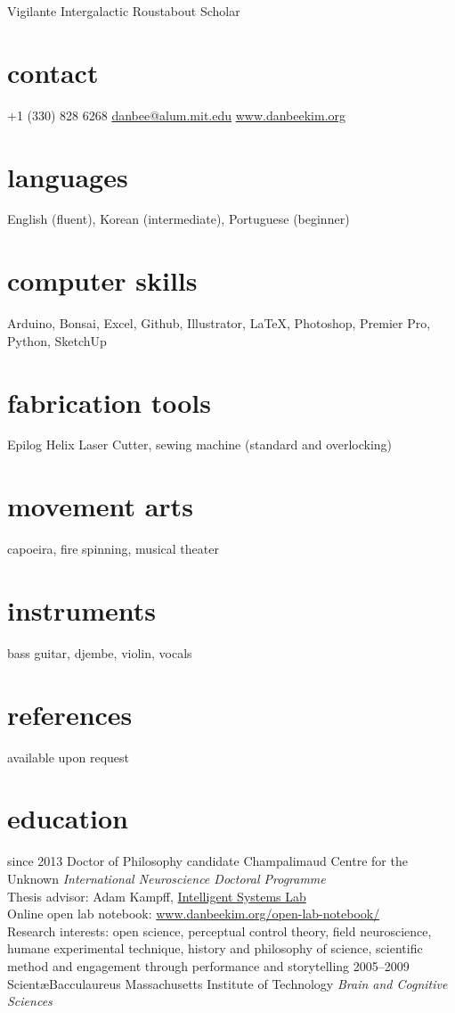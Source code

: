 \documentclass[]{friggeri-cv}
\begin{document}
       {Vigilante Intergalactic Roustabout Scholar}


\begin{aside}
  \section{contact}
    +1 (330) 828 6268
    \href{mailto:danbee@alum.mit.edu}{danbee@alum.mit.edu}
    \href{www.danbeekim.org}{www.danbeekim.org}
  \section{languages}
    English (fluent),
    Korean (intermediate),
    Portuguese (beginner)
  \section{computer skills}
    Arduino, Bonsai, Excel,
    Github, Illustrator, 
    \LaTeX, Photoshop,
    Premier Pro, Python,
    SketchUp
  \section{fabrication tools}
    Epilog Helix Laser Cutter,
    sewing machine (standard and overlocking)
  \section{movement arts}
    capoeira, fire spinning,
    musical theater
  \section{instruments}
    bass guitar, djembe,
    violin, vocals
  \section{references}
    available upon request        
\end{aside}

\section{education}

\begin{entrylist}
  \entry
    {since 2013}
    {Doctor of Philosophy candidate}
    {Champalimaud Centre for the Unknown}
    {\emph{International Neuroscience Doctoral Programme}\\
    Thesis advisor: Adam Kampff, \href{www.kampff-lab.org}{Intelligent Systems Lab}\\
    Online open lab notebook: \href{www.danbeekim.org/open-lab-notebook}{www.danbeekim.org/open-lab-notebook/}\\
    Research interests: open science, perceptual control theory, field neuroscience, humane experimental technique, history and philosophy of science, scientific method and engagement through performance and storytelling}
  \entry
    {2005–2009}
    {Scient\ae Bacculaureus}
    {Massachusetts Institute of Technology}
    {\emph{Brain and Cognitive Sciences}}
\end{entrylist}
\end{document}

